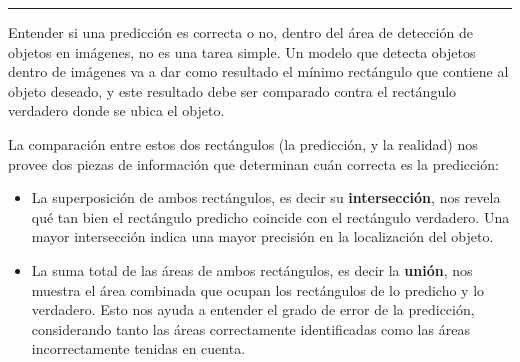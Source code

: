 \documentclass[a4paper]{article}
\begin{document}
\hrule

\begin{figure}[H]
\end{figure}

Entender si una predicción es correcta o no, dentro del área de detección de objetos en imágenes, no es una tarea simple. Un modelo que detecta objetos dentro de imágenes va a dar como resultado el mínimo rectángulo que contiene al objeto deseado, y este resultado debe ser comparado contra el rectángulo verdadero donde se ubica el objeto.\medskip

La comparación entre estos dos rectángulos (la predicción, y la realidad) nos provee dos piezas de información que determinan cuán correcta es la predicción:

\begin{itemize}
\itemsep0em
    \item La superposición de ambos rectángulos, es decir su \textbf{intersección}, nos revela qué tan bien el rectángulo predicho coincide con el rectángulo verdadero. Una mayor intersección indica una mayor precisión en la localización del objeto.
    \item La suma total de las áreas de ambos rectángulos, es decir la \textbf{unión}, nos muestra el área combinada que ocupan los rectángulos de lo predicho y lo verdadero. Esto nos ayuda a entender el grado de error de la predicción, considerando tanto las áreas correctamente identificadas como las áreas incorrectamente tenidas en cuenta.
\end{itemize}
\end{document}

